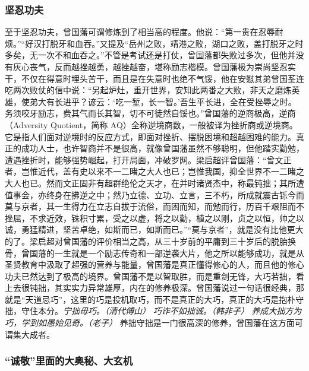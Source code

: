 \subsubsection{坚忍功夫}

至于坚忍功夫，曾国藩可谓修炼到了相当高的程度。他说：“第一贵在忍辱耐烦。”“好汉打脱牙和血吞。”又提及“岳州之败，靖港之败，湖口之败，盖打脱牙之时多矣，无一次不和血吞之。”不管是考试还是打仗，曾国藩都失败过多次，但他并没有灰心丧气，反而越挫越勇，越挫越奋，堪称励志楷模。曾国藩极为崇尚坚忍实干，不仅在得意时埋头苦干，而且是在失意时也绝不气馁，他在安慰其弟曾国荃连吃两次败仗的信中说：“另起炉灶，重开世界，安知此两番之大败，非天之磨炼英雄，使弟大有长进乎？谚云：‘吃一堑，长一智。’吾生平长进，全在受挫辱之时。务须咬牙励志，费其气而长其智，切不可徒然自馁也。”曾国藩的逆商极高，逆商（Adversity Quotient，简称 AQ）全称逆境商数，一般被译为挫折商或逆境商。它是指人们面对逆境时的反应方式，即面对挫折、摆脱困境和超越困难的能力。真正的成功人士，也许智商并不是很高，就像曾国藩虽然不够聪明，但他踏实勤勉，遭遇挫折时，能够强势崛起，打开局面，冲破罗网。梁启超评曾国藩：“曾文正者，岂惟近代，盖有史以来不一二睹之大人也已；岂惟我国，抑全世界不一二睹之大人也已。然而文正固非有超群绝伦之天才，在并时诸贤杰中，称最钝拙；其所遭值事会，亦终身在拂逆之中；然乃立德、立功、立言，三不朽，所成就震古铄今而莫与京者，其一生得力在立志自拔于流俗，而困而知，而勉而行，历百千艰阻而不挫屈，不求近效，铢积寸累，受之以虚，将之以勤，植之以刚，贞之以恒，帅之以诚，勇猛精进，坚苦卓绝，如斯而已，如斯而已。”“莫与京者”，就是没有比他更大的了。梁启超对曾国藩的评价相当之高，从三十岁前的平庸到三十岁后的脱胎换骨，曾国藩的一生就是一个励志传奇和一部逆袭大片，他之所以能够成功，就是从圣贤教育中汲取了超强的营养与能量，曾国藩是真正懂得修心的人，而且他的修心功夫已然达到了极高的境界。曾国藩不是以智取胜，而是重剑无锋，大巧若拙，看上去很钝拙，其实实力异常雄厚，内在的修养极深。曾国藩说过一句话很经典，那就是“天道忌巧”，这里的巧是投机取巧，而不是真正的大巧，真正的大巧是抱朴守拙，守住本分。\textit{宁拙毋巧。（清代傅山）} \textit{巧诈不如拙诚。（韩非子）} \textit{养成大拙方为巧，学到如愚始见奇。（老子）} 养拙守拙是一门很高深的修养，曾国藩在这方面可谓集大成者。

\subsubsection{“诚敬”里面的大奥秘、大玄机}

